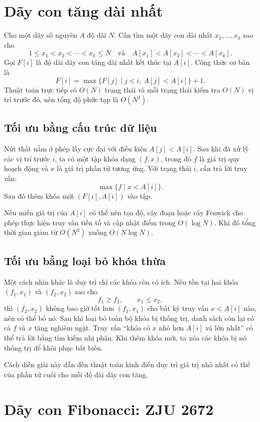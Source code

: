 \documentclass[11pt]{article}
\begin{document}
\section{Dãy con tăng dài nhất}

Cho một dãy số nguyên $A$ độ dài $N$. Cần tìm một dãy con dài nhất
$x_1,\ldots,x_k$ sao cho
\[
  1\le x_1<x_2<\cdots<x_k\le N
  \quad\text{và}\quad
  A[x_1]<A[x_2]<\cdots<A[x_k].
\]
Gọi $F[i]$ là độ dài dãy con tăng dài nhất kết thúc tại $A[i]$. Công thức cơ
bản là
\[
  F[i]=\max\{F[j]\mid j<i,\ A[j]<A[i]\}+1.
\]
Thuật toán trực tiếp có $O(N)$ trạng thái và mỗi trạng thái kiểm tra $O(N)$ vị
trí trước đó, nên tổng độ phức tạp là $O(N^2)$.

\subsection*{Tối ưu bằng cấu trúc dữ liệu}

Nút thắt nằm ở phép lấy cực đại với điều kiện $A[j]<A[i]$. Sau khi đã xử lý
các vị trí trước $i$, ta có một tập khóa dạng $(f,x)$, trong đó $f$ là giá trị
quy hoạch động và $x$ là giá trị phần tử tương ứng. Với trạng thái $i$, cần
trả lời truy vấn:
\[
  \max\{f\mid x<A[i]\}.
\]
Sau đó thêm khóa mới $(F[i],A[i])$ vào tập.

Nếu miền giá trị của $A[i]$ có thể nén tọa độ, cây đoạn hoặc cây Fenwick cho
phép thực hiện truy vấn tiền tố và cập nhật điểm trong $O(\log N)$. Khi đó
tổng thời gian giảm từ $O(N^2)$ xuống $O(N\log N)$.

\subsection*{Tối ưu bằng loại bỏ khóa thừa}

Một cách nhìn khác là duy trì chỉ các khóa còn có ích. Nếu tồn tại hai khóa
$(f_1,x_1)$ và $(f_2,x_2)$ sao cho
\[
  f_1\ge f_2,\qquad x_1\le x_2,
\]
thì $(f_2,x_2)$ không bao giờ tốt hơn $(f_1,x_1)$ cho bất kỳ truy vấn
$x<A[i]$ nào, nên có thể bỏ nó. Sau khi loại bỏ toàn bộ khóa bị thống trị,
danh sách còn lại có cả $f$ và $x$ tăng nghiêm ngặt. Truy vấn ``khóa có $x$
nhỏ hơn $A[i]$ và lớn nhất'' có thể trả lời bằng tìm kiếm nhị phân. Khi thêm
khóa mới, ta xóa các khóa bị nó thống trị để khôi phục bất biến.

Cách diễn giải này dẫn đến thuật toán kinh điển duy trì giá trị nhỏ nhất có
thể của phần tử cuối cho mỗi độ dài dãy con tăng.

\section{Dãy con Fibonacci: ZJU 2672}
\end{document}
